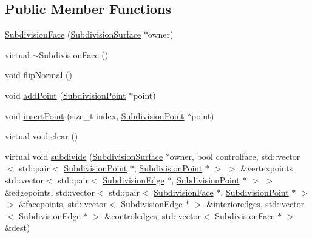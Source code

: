 \subsection*{Public Member Functions}
\begin{DoxyCompactItemize}
\item 
\hyperlink{classShipCADGeometry_1_1SubdivisionFace_a082f81f7a5750f7e53ed5a92ddc82350}{Subdivision\-Face} (\hyperlink{classShipCADGeometry_1_1SubdivisionSurface}{Subdivision\-Surface} $\ast$owner)
\item 
virtual \hyperlink{classShipCADGeometry_1_1SubdivisionFace_a44a0acc598533bf6846e4f7272e5c191}{$\sim$\-Subdivision\-Face} ()
\item 
void \hyperlink{classShipCADGeometry_1_1SubdivisionFace_a16d5e005d1c7c847ccf9ba72b67142fa}{flip\-Normal} ()
\item 
void \hyperlink{classShipCADGeometry_1_1SubdivisionFace_a553df49a1137f89d2df2846ffca74842}{add\-Point} (\hyperlink{classShipCADGeometry_1_1SubdivisionPoint}{Subdivision\-Point} $\ast$point)
\item 
void \hyperlink{classShipCADGeometry_1_1SubdivisionFace_aacd383eb085c4f6b92db89e25be6b3a1}{insert\-Point} (size\-\_\-t index, \hyperlink{classShipCADGeometry_1_1SubdivisionPoint}{Subdivision\-Point} $\ast$point)
\item 
virtual void \hyperlink{classShipCADGeometry_1_1SubdivisionFace_a413ae7e76f559780c8a69e998974fb75}{clear} ()
\item 
virtual void \hyperlink{classShipCADGeometry_1_1SubdivisionFace_a85362079fffc9b625e26059bd95cfa55}{subdivide} (\hyperlink{classShipCADGeometry_1_1SubdivisionSurface}{Subdivision\-Surface} $\ast$owner, bool controlface, std\-::vector$<$ std\-::pair$<$ \hyperlink{classShipCADGeometry_1_1SubdivisionPoint}{Subdivision\-Point} $\ast$, \hyperlink{classShipCADGeometry_1_1SubdivisionPoint}{Subdivision\-Point} $\ast$ $>$ $>$ \&vertexpoints, std\-::vector$<$ std\-::pair$<$ \hyperlink{classShipCADGeometry_1_1SubdivisionEdge}{Subdivision\-Edge} $\ast$, \hyperlink{classShipCADGeometry_1_1SubdivisionPoint}{Subdivision\-Point} $\ast$ $>$ $>$ \&edgepoints, std\-::vector$<$ std\-::pair$<$ \hyperlink{classShipCADGeometry_1_1SubdivisionFace}{Subdivision\-Face} $\ast$, \hyperlink{classShipCADGeometry_1_1SubdivisionPoint}{Subdivision\-Point} $\ast$ $>$ $>$ \&facepoints, std\-::vector$<$ \hyperlink{classShipCADGeometry_1_1SubdivisionEdge}{Subdivision\-Edge} $\ast$ $>$ \&interioredges, std\-::vector$<$ \hyperlink{classShipCADGeometry_1_1SubdivisionEdge}{Subdivision\-Edge} $\ast$ $>$ \&controledges, std\-::vector$<$ \hyperlink{classShipCADGeometry_1_1SubdivisionFace}{Subdivision\-Face} $\ast$ $>$ \&dest)

\end{DoxyCompactItemize}
